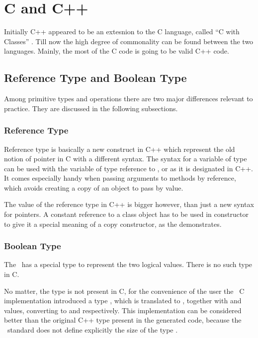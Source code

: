 \chapter{C and C++}
\label{chapter:CAndCpp}

Initially C++ appeared to be an extesnion to the C language, called ``C with Classes'' \cite{cwithclasses}. Till now the high degree
of commonality can be found between the two languages. Mainly, the most of the C code is going to be valid C++ code. 

\section{Reference Type and Boolean Type}

Among primitive types and operations there are two major differences relevant to practice.
They are discussed in the following subsections.

\subsection{Reference Type}

Reference type is basically a new construct in C++ which represent the old notion of pointer in C with a different syntax.
The syntax for a variable of type  can be used with the variable of type reference to , or  as it is designated in C++.
It comes especially handy when passing arguments to methods by reference, which avoids creating a copy of an object to pass 
by value.

The value of the reference type in C++ is bigger however, than just a new syntax for pointers. A constant reference to a class object 
has to be used in constructor to give it a special meaning of a copy constructor, as the  demonstrates.


\subsection{Boolean Type}

The \cpppl\ has a special  type to represent the two logical values. There is no such type in C.

No matter, the  type is not present in C, for the convenience of the user the \mb\ C implementation introduced a type ,
which is translated to , together with  and  values, converting to  and  respectively.
This implementation can be considered better than the original C++  type present in the generated code, because the \cpppl\ standard
does not define explicitly the size of the  type \cite{cpp11}.


